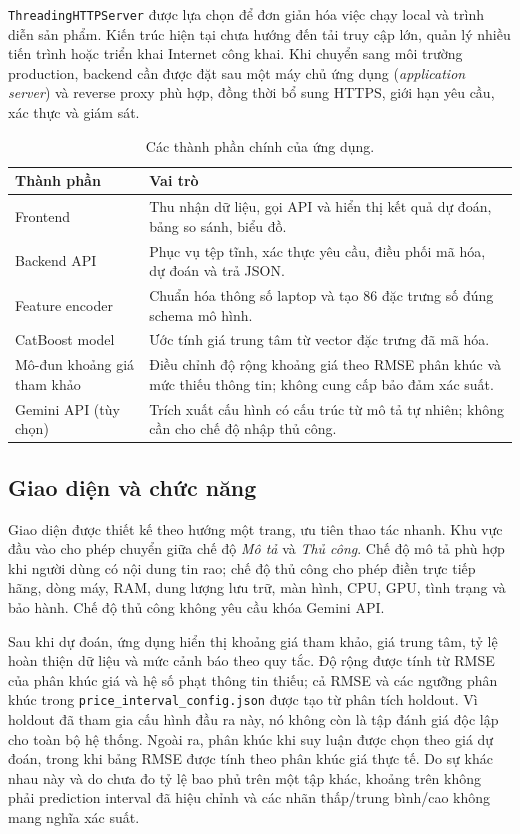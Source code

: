 \texttt{ThreadingHTTPServer} được lựa chọn để đơn giản hóa việc chạy local và trình diễn sản phẩm. Kiến trúc hiện tại chưa hướng đến tải truy cập lớn, quản lý nhiều tiến trình hoặc triển khai Internet công khai. Khi chuyển sang môi trường production, backend cần được đặt sau một máy chủ ứng dụng (\textit{application server}) và reverse proxy phù hợp, đồng thời bổ sung HTTPS, giới hạn yêu cầu, xác thực và giám sát.

\begin{table}[H]
\centering
\caption{Các thành phần chính của ứng dụng.}
\label{tab:application-components}
\begin{tabularx}{\textwidth}{>{\RaggedRight\arraybackslash}p{} X}
\toprule
\textbf{Thành phần} & \textbf{Vai trò} \\
\midrule
Frontend & Thu nhận dữ liệu, gọi API và hiển thị kết quả dự đoán, bảng so sánh, biểu đồ. \\
Backend API & Phục vụ tệp tĩnh, xác thực yêu cầu, điều phối mã hóa, dự đoán và trả JSON. \\
Feature encoder & Chuẩn hóa thông số laptop và tạo 86 đặc trưng số đúng schema mô hình. \\
CatBoost model & Ước tính giá trung tâm từ vector đặc trưng đã mã hóa. \\
Mô-đun khoảng giá tham khảo & Điều chỉnh độ rộng khoảng giá theo RMSE phân khúc và mức thiếu thông tin; không cung cấp bảo đảm xác suất. \\
Gemini API (tùy chọn) & Trích xuất cấu hình có cấu trúc từ mô tả tự nhiên; không cần cho chế độ nhập thủ công. \\
\bottomrule
\end{tabularx}
\end{table}

\subsection{Giao diện và chức năng}

Giao diện được thiết kế theo hướng một trang, ưu tiên thao tác nhanh. Khu vực đầu vào cho phép chuyển giữa chế độ \textit{Mô tả} và \textit{Thủ công}. Chế độ mô tả phù hợp khi người dùng có nội dung tin rao; chế độ thủ công cho phép điền trực tiếp hãng, dòng máy, RAM, dung lượng lưu trữ, màn hình, CPU, GPU, tình trạng và bảo hành. Chế độ thủ công không yêu cầu khóa Gemini API.

Sau khi dự đoán, ứng dụng hiển thị khoảng giá tham khảo, giá trung tâm, tỷ lệ hoàn thiện dữ liệu và mức cảnh báo theo quy tắc. Độ rộng được tính từ RMSE của phân khúc giá và hệ số phạt thông tin thiếu; cả RMSE và các ngưỡng phân khúc trong \texttt{price\_interval\_config.json} được tạo từ phân tích holdout. Vì holdout đã tham gia cấu hình đầu ra này, nó không còn là tập đánh giá độc lập cho toàn bộ hệ thống. Ngoài ra, phân khúc khi suy luận được chọn theo giá dự đoán, trong khi bảng RMSE được tính theo phân khúc giá thực tế. Do sự khác nhau này và do chưa đo tỷ lệ bao phủ trên một tập khác, khoảng trên không phải prediction interval đã hiệu chỉnh và các nhãn thấp/trung bình/cao không mang nghĩa xác suất.

